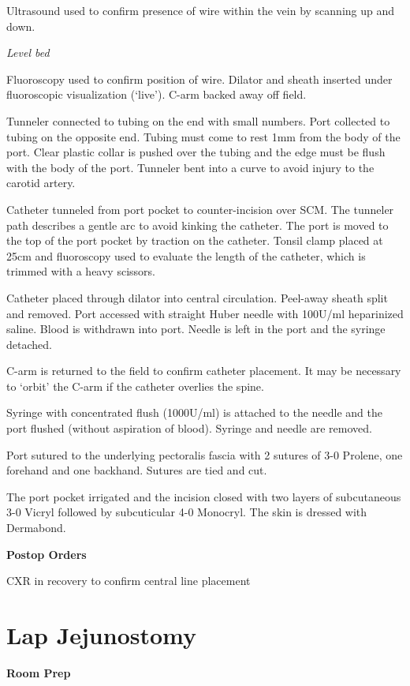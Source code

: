 \documentclass[
  letterpaper,
]{scrbook}
\begin{document}
Ultrasound used to confirm presence of wire within the vein by scanning
up and down.

\emph{Level bed}

Fluoroscopy used to confirm position of wire. Dilator and sheath
inserted under fluoroscopic visualization (`live'). C-arm backed away
off field.

Tunneler connected to tubing on the end with small numbers. Port
collected to tubing on the opposite end. Tubing must come to rest 1mm
from the body of the port. Clear plastic collar is pushed over the
tubing and the edge must be flush with the body of the port. Tunneler
bent into a curve to avoid injury to the carotid artery.

Catheter tunneled from port pocket to counter-incision over SCM. The
tunneler path describes a gentle arc to avoid kinking the catheter. The
port is moved to the top of the port pocket by traction on the catheter.
Tonsil clamp placed at 25cm and fluoroscopy used to evaluate the length
of the catheter, which is trimmed with a heavy scissors.

Catheter placed through dilator into central circulation. Peel-away
sheath split and removed. Port accessed with straight Huber needle with
100U/ml heparinized saline. Blood is withdrawn into port. Needle is left
in the port and the syringe detached.

C-arm is returned to the field to confirm catheter placement. It may be
necessary to `orbit' the C-arm if the catheter overlies the spine.

Syringe with concentrated flush (1000U/ml) is attached to the needle and
the port flushed (without aspiration of blood). Syringe and needle are
removed.

Port sutured to the underlying pectoralis fascia with 2 sutures of 3-0
Prolene, one forehand and one backhand. Sutures are tied and cut.

The port pocket irrigated and the incision closed with two layers of
subcutaneous 3-0 Vicryl followed by subcuticular 4-0 Monocryl. The skin
is dressed with Dermabond.

\textbf{Postop Orders}

CXR in recovery to confirm central line placement

\chapter{Lap Jejunostomy}\label{lap-jejunostomy}

\textbf{Room Prep}
\end{document}
